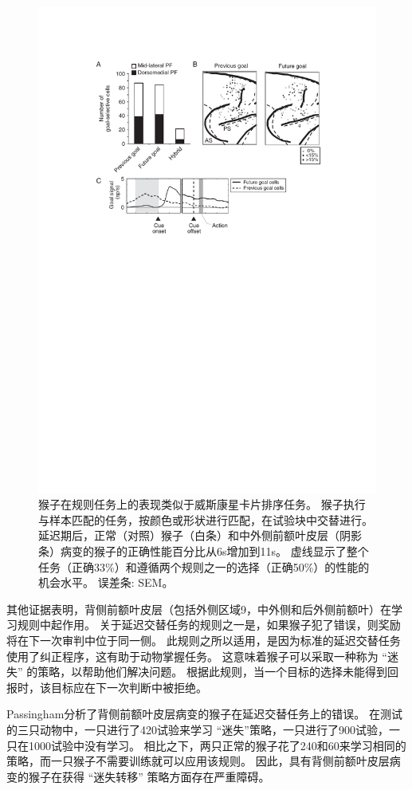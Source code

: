 \begin{figure}
	\centering
	\includegraphics[width=0.7\linewidth]{chap6/6_7}
	\caption{猴子在规则任务上的表现类似于威斯康星卡片排序任务。
		猴子执行与样本匹配的任务，按颜色或形状进行匹配，在试验块中交替进行。
		延迟期后，正常（对照）猴子（白条）和中外侧前额叶皮层（阴影条）病变的猴子的正确性能百分比从6s增加到11s。
		虚线显示了整个任务（正确33\%）和遵循两个规则之一的选择（正确50\%）的性能的机会水平。
		误差条: SEM\cite{buckley2009dissociable}。}
	\label{fig:6_6}
\end{figure}


其他证据表明，背侧前额叶皮层（包括外侧区域9，中外侧和后外侧前额叶）在学习规则中起作用。
关于延迟交替任务的规则之一是，如果猴子犯了错误，则奖励将在下一次审判中位于同一侧。
此规则之所以适用，是因为标准的延迟交替任务使用了纠正程序，这有助于动物掌握任务。
这意味着猴子可以采取一种称为 “迷失” 的策略，以帮助他们解决问题。
根据此规则，当一个目标的选择未能得到回报时，该目标应在下一次判断中被拒绝。


Passingham\cite{passingham1975delayed}分析了背侧前额叶皮层病变的猴子在延迟交替任务上的错误。
在测试的三只动物中，一只进行了420试验来学习 “迷失”策略，一只进行了900试验，一只在1000试验中没有学习。
相比之下，两只正常的猴子花了240和60来学习相同的策略，而一只猴子不需要训练就可以应用该规则。
因此，具有背侧前额叶皮层病变的猴子在获得 “迷失转移” 策略方面存在严重障碍。


